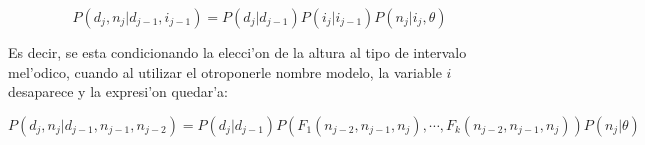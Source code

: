 $$P(d_j, n_j | d_{j-1}, i_{j-1}) = P(d_j|d_{j-1})P(i_j| i_{j-1})P(n_j | i_j, \theta)$$

Es decir, se esta condicionando la elecci'on de la altura al tipo de intervalo mel'odico, cuando al utilizar el otro\alert{ponerle nombre} modelo,
la variable $i$ desaparece y la expresi'on quedar'a:

$$P(d_j, n_j | d_{j-1}, n_{j-1}, n_{j-2}) = P(d_j|d_{j-1})P(F_1(n_{j-2}, n_{j-1}, n_j), \cdots, F_k(n_{j-2}, n_{j-1}, n_j)) P(n_j | \theta)$$

